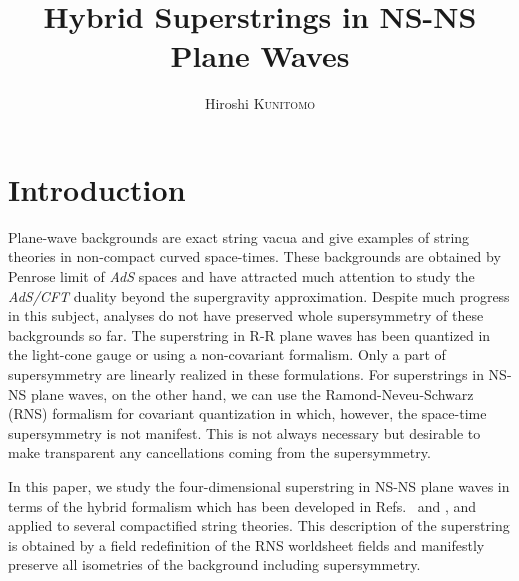 \documentclass[a4paper,seceq,preprint]{ptptex}
\title{%
Hybrid Superstrings in NS-NS Plane Waves
}
\author{%
Hiroshi \textsc{Kunitomo}%
}
\begin{document}
\maketitle

\section{Introduction}\label{intro}

Plane-wave backgrounds are exact string vacua and 
give examples of string theories in non-compact 
curved space-times. These backgrounds are obtained 
by Penrose limit of {\it AdS} spaces and have 
attracted much attention to study the {\it AdS/CFT} 
duality beyond the supergravity approximation.\cite{BMN} 
Despite much progress in this subject, analyses do not
have preserved whole supersymmetry of these 
backgrounds so far. The superstring in R-R plane waves has 
been quantized in the light-cone gauge\cite{M} or using 
a non-covariant formalism.\cite{BM} Only a part of 
supersymmetry are linearly realized in these formulations.
For superstrings in NS-NS plane waves, on the other hand,
we can use the Ramond-Neveu-Schwarz (RNS)
formalism for covariant quantization
in which, however, the space-time
supersymmetry is not manifest.
This is not always necessary but desirable to make 
transparent any cancellations coming from the supersymmetry. 

In this paper, we study the four-dimensional superstring 
in NS-NS plane waves in terms of the hybrid formalism
which has been developed in Refs.~ and , 
and applied to several compactified string theories.\cite{compact}
This description of the superstring is obtained by 
a field redefinition of the RNS worldsheet fields and 
manifestly preserve all isometries of the background 
including supersymmetry.
\end{document}
